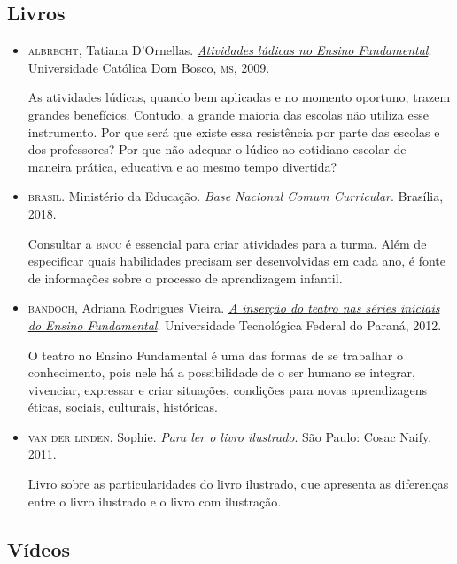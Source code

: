 \documentclass[11pt]{extarticle}
\begin{document}
\subsection{Livros}

\begin{itemize}

	\item \textsc{albrecht}, Tatiana D'Ornellas. \href{https://site.ucdb.br/public/md-dissertacoes/8072-atividades-ludicas-no-ensino-fundamental-uma-intervencao-pedagogica.pdf}{\textit{Atividades lúdicas no Ensino Fundamental}}. Universidade Católica Dom Bosco, \textsc{ms}, 2009. 

	As atividades lúdicas, quando bem aplicadas e no momento oportuno, trazem
grandes benefícios. Contudo, a grande maioria das escolas não utiliza esse instrumento. Por
que será que existe essa resistência por parte das escolas e dos professores? Por que não
adequar o lúdico ao cotidiano escolar de maneira prática, educativa e ao mesmo tempo
divertida?

\item \textsc{brasil}. Ministério da Educação. \textit{Base Nacional Comum Curricular}. Brasília, 2018.

Consultar a \textsc{bncc} é essencial para criar atividades para a turma. Além de especificar 
quais habilidades precisam ser desenvolvidas em cada ano, é fonte de informações sobre 
o processo de aprendizagem infantil. 

 \item \textsc{bandoch}, Adriana Rodrigues Vieira. \href{http://repositorio.utfpr.edu.br/jspui/bitstream/1/20738/2/MD_EDUMTE_II_2012_03.pdf}{\textit{A inserção do teatro nas séries iniciais do Ensino Fundamental}}.
 Universidade Tecnológica Federal do Paraná, 2012. 

	O teatro no Ensino Fundamental é uma das formas de se trabalhar o conhecimento,
pois nele há a possibilidade de o ser humano se integrar, vivenciar, expressar e
criar situações, condições para novas aprendizagens éticas, sociais, culturais,
históricas.


\item \textsc{van der linden}, Sophie. \textit{Para ler o livro ilustrado}. São Paulo: Cosac Naify, 2011.

Livro sobre as particularidades do livro ilustrado, que apresenta as diferenças entre o livro ilustrado e o livro com ilustração. 
\end{itemize}

\subsection{Vídeos}
\end{document}
